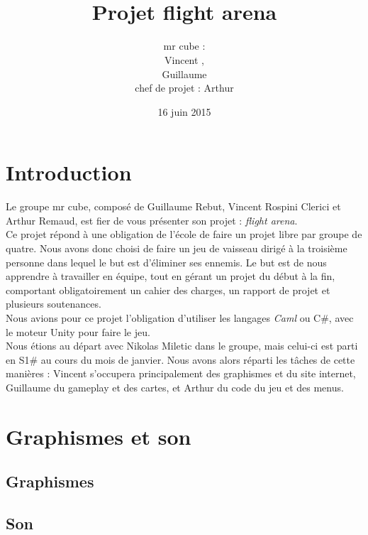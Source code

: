 \documentclass[12pt, titlepage]{article}
\title{\bsc{rapport de projet}\\Projet flight arena}
\author{mr cube :\\
Vincent \bsc{Rospini-Clerici},\\
Guillaume \bsc{Rebut}\\
chef de projet : Arthur \bsc{Remaud}}
\date{16 juin 2015}
\begin{document}
\begin{spacing}{1.5}

\maketitle

\renewcommand{\contentsname}{Sommaire}
\renewcommand{\chaptername}{Partie}

\tableofcontents
{}


\newpage
\section*{Introduction}

Le groupe mr cube, composé de Guillaume Rebut, Vincent Rospini Clerici et Arthur Remaud, est fier de vous présenter son projet : \textit{flight arena}.\\

Ce projet répond à une obligation de l'école  de faire un projet libre par groupe de quatre. Nous avons donc choisi de faire un jeu de vaisseau dirigé à la troisième personne dans lequel le but est d'éliminer ses ennemis. Le but est de nous apprendre à travailler en équipe, tout en gérant un projet du début à la fin, comportant obligatoirement un cahier des charges, un rapport de projet et plusieurs soutenances.\\

Nous avions pour ce projet l'obligation d'utiliser les langages \textit{Caml} ou {C\#}, avec le moteur Unity pour faire le jeu.\\

Nous étions au départ avec Nikolas Miletic dans le groupe, mais celui-ci est parti en S1\# au cours du mois de janvier. Nous avons alors réparti les tâches de cette manières : Vincent s'occupera principalement des graphismes et du site internet, Guillaume du gameplay et des cartes, et Arthur du code du jeu et des menus.

\newpage
\section{Graphismes et son}

\subsection{Graphismes}

\subsection{Son}


\end{spacing}
\end{document}
